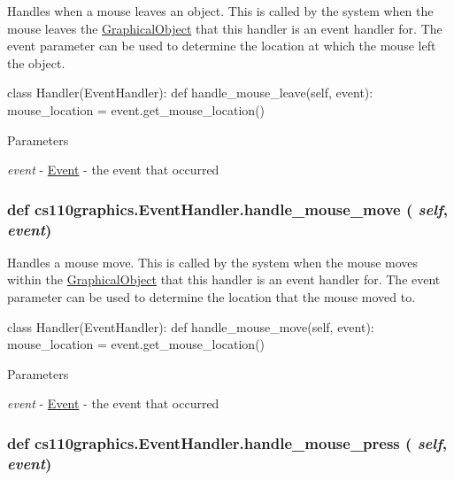 Handles when a mouse leaves an object. This is called by the system when the mouse leaves the \hyperlink{classcs110graphics_1_1GraphicalObject}{GraphicalObject} that this handler is an event handler for. The event parameter can be used to determine the location at which the mouse left the object. 
\begin{DoxyCode}
 class Handler(EventHandler):
     def handle_mouse_leave(self, event):
         mouse_location = event.get_mouse_location()
\end{DoxyCode}
 
\begin{DoxyParams}{Parameters}
\item[{\em event}]-\/ \hyperlink{classcs110graphics_1_1Event}{Event} -\/ the event that occurred \end{DoxyParams}
\hypertarget{classcs110graphics_1_1EventHandler_a521fdcd170d15c0b8baa124c78b6d1ef}{
\subsubsection[{handle\_\-mouse\_\-move}]{\setlength{\rightskip}{0pt plus 5cm}def cs110graphics.EventHandler.handle\_\-mouse\_\-move ( {\em self}, \/   {\em event})}}
\label{classcs110graphics_1_1EventHandler_a521fdcd170d15c0b8baa124c78b6d1ef}


Handles a mouse move. This is called by the system when the mouse moves within the \hyperlink{classcs110graphics_1_1GraphicalObject}{GraphicalObject} that this handler is an event handler for. The event parameter can be used to determine the location that the mouse moved to. 
\begin{DoxyCode}
 class Handler(EventHandler):
     def handle_mouse_move(self, event):
         mouse_location = event.get_mouse_location()
\end{DoxyCode}
 
\begin{DoxyParams}{Parameters}
\item[{\em event}]-\/ \hyperlink{classcs110graphics_1_1Event}{Event} -\/ the event that occurred \end{DoxyParams}
\hypertarget{classcs110graphics_1_1EventHandler_a547873123ebcd3fcc63a2e03d2a2fee3}{
\subsubsection[{handle\_\-mouse\_\-press}]{\setlength{\rightskip}{0pt plus 5cm}def cs110graphics.EventHandler.handle\_\-mouse\_\-press ( {\em self}, \/   {\em event})}}
\label{classcs110graphics_1_1EventHandler_a547873123ebcd3fcc63a2e03d2a2fee3}


